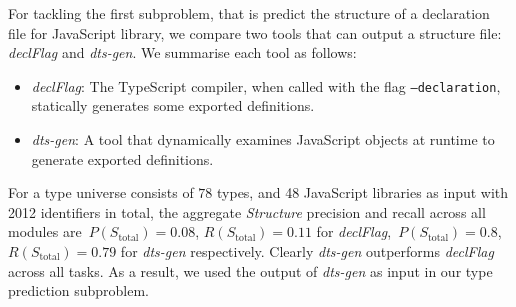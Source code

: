 \documentclass[sigplan,10pt,review,anonymous]{acmart} %
\theoremstyle{plain}
\theoremstyle{remark}
\theoremstyle{definition}
\begin{document}

For tackling the first subproblem, that is predict the structure of a declaration file for JavaScript library, we compare two tools that can output a structure file: \textit{declFlag} and \textit{dts-gen}.
We summarise each tool as follows:
\begin{itemize}[label={\tiny$\bullet$}]
	\item \textit{declFlag}: The TypeScript compiler, when called with the flag
	      \texttt{--declaration}, statically generates some exported definitions.
	\item \textit{dts-gen}: A tool that dynamically examines JavaScript objects at
	      runtime to generate exported definitions.
\end{itemize}
For a type universe consists of $78$ types, and 48 JavaScript libraries as input with 2012 identifiers in total, the aggregate \textit{Structure} precision and recall across all modules are~$P(S_\text{total}) = 0.08$,
$R(S_\text{total}) = 0.11$ for \textit{declFlag},~$P(S_\text{total}) = 0.8$,
$R(S_\text{total}) = 0.79$ for \textit{dts-gen} respectively.
Clearly \textit{dts-gen} outperforms \textit{declFlag} across all tasks.
As a result, we used the output of \textit{dts-gen} as input in our type prediction subproblem. 
\end{document}
